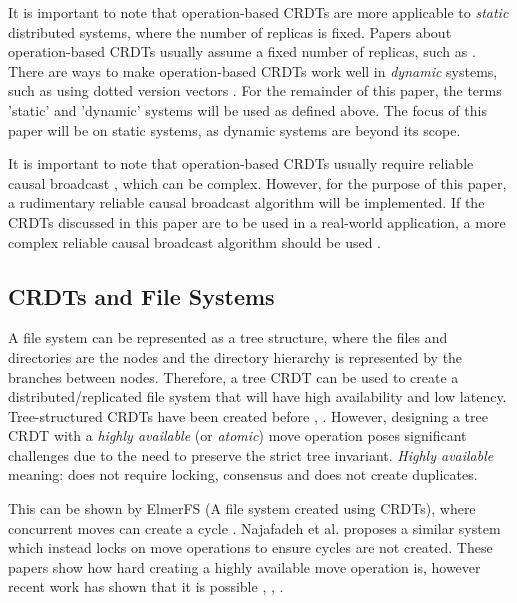 \documentclass[12pt]{report}
\begin{document}
It is important to note that operation-based CRDTs are more applicable to \textit{static} distributed systems, where the number of replicas is fixed. Papers about operation-based CRDTs usually assume a fixed number of replicas, such as \cite{baquero2017pure}. There are ways to make operation-based CRDTs work well in \textit{dynamic} systems, such as using dotted version vectors \cite{preguiça2010dotted}. For the remainder of this paper, the terms 'static' and 'dynamic' systems will be used as defined above. The focus of this paper will be on static systems, as dynamic systems are beyond its scope.\par 

It is important to note that operation-based CRDTs usually require reliable causal broadcast \cite{10.1007/978-3-662-43352-2_11}, which can be complex. However, for the purpose of this paper, a rudimentary reliable causal broadcast algorithm will be implemented. If the CRDTs discussed in this paper are to be used in a real-world application, a more complex reliable causal broadcast algorithm should be used \cite{10.1145/128738.128742}. \par

\subsection{CRDTs and File Systems}
A file system can be represented as a tree structure, where the files and directories are the nodes and the directory hierarchy is represented by the branches between nodes. Therefore, a tree CRDT can be used to create a distributed/replicated file system that will have high availability and low latency. Tree-structured CRDTs have been created before \cite{10.1145/2757667.2757683}, \cite{kleppmann2018automerge}. However, designing a tree CRDT with a \textit{highly available} (or \textit{atomic}) move operation poses significant challenges due to the need to preserve the strict tree invariant. \textit{Highly available} meaning: does not require locking, consensus and does not create duplicates.   \par

This can be shown by ElmerFS (A file system created using CRDTs), where concurrent moves can create a cycle \cite{10.1145/3465332.3470872}. Najafadeh et al. \cite{Najafzadeh0E18} proposes a similar system which instead locks on move operations to ensure cycles are not created. These papers show how hard creating a highly available move operation is, however recent work has shown that it is possible \cite{9563274}, \cite{https://doi.org/10.48550/arxiv.2103.04828}, \cite{https://doi.org/10.48550/arxiv.1805.04263}. \par
\end{document}
